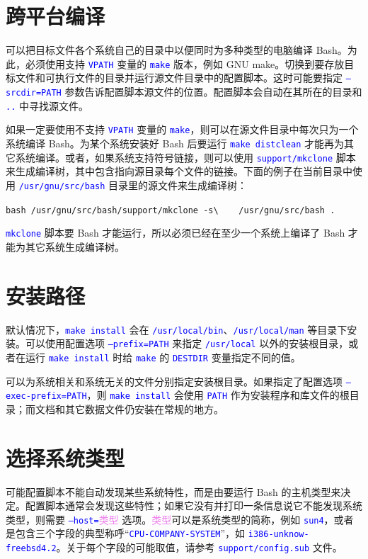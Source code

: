 \documentclass[openany,notitlepage]{book}
\newcommand{\codeblock}[1]{\begin{center}\begin{minipage}{.7\textwidth}{\tt #1}\end{minipage}\end{center}}
\newcommand{\codeSpecial}[1]{\textcolor[RGB]{255,20,147}{\texttt{#1}}}
\newcommand{\code}[1]{\textcolor{blue}{{\tt #1}}}
\newcommand{\hs}[1]{{\textcolor{violet}{#1}}}
\newcommand{\tab}{\mbox{\ \ \ \ }}
\begin{document}
\begin{CJK}{UTF8}{song}
\section{跨平台编译} %
可以把目标文件各个系统自己的目录中以便同时为多种类型的电脑编译 Bash。为此，必须使用支持 \code{VPATH} 变量的 \code{make} 版本，例如 GNU make。切换到要存放目标文件和可执行文件的目录并运行源文件目录中的配置脚本。这时可能要指定 \code{--srcdir=PATH} 参数告诉配置脚本源文件的位置。配置脚本会自动在其所在的目录和 \code{..} 中寻找源文件。

如果一定要使用不支持 \code{VPATH} 变量的 \code{make}，则可以在源文件目录中每次只为一个系统编译 Bash。为某个系统安装好 Bash 后要运行 \code{make distclean} 才能再为其它系统编译。或者，如果系统支持符号链接，则可以使用 \code{support/mkclone} 脚本来生成编译树，其中包含指向源目录每个文件的链接。下面的例子在当前目录中使用 \code{/usr/gnu/src/bash} 目录里的源文件来生成编译树：
    \codeblock{bash /usr/gnu/src/bash/support/mkclone \codeSpecial{-s}\textbackslash\newline\tab/usr/gnu/src/bash .}
\code{mkclone} 脚本要 Bash 才能运行，所以必须已经在至少一个系统上编译了 Bash 才能为其它系统生成编译树。

\section{安装路径} %
默认情况下，\code{make install} 会在 \code{/usr/local/bin}、\code{/usr/local/man} 等目录下安装。可以使用配置选项 \code{--prefix=PATH} 来指定 \code{/usr/local} 以外的安装根目录，或者在运行 \code{make install} 时给 \code{make} 的 \code{DESTDIR} 变量指定不同的值。

可以为系统相关和系统无关的文件分别指定安装根目录。如果指定了配置选项 \code{--exec-prefix=PATH}，则 \code{make install} 会使用 \code{PATH} 作为安装程序和库文件的根目录；而文档和其它数据文件仍安装在常规的地方。

\section{选择系统类型} %
可能配置脚本不能自动发现某些系统特性，而是由要运行 Bash 的主机类型来决定。配置脚本通常会发现这些特性；如果它没有并打印一条信息说它不能发现系统类型，则需要 \code{--host=}\hs{类型} 选项。\hs{类型}可以是系统类型的简称，例如 \code{sun4}，或者是包含三个字段的典型称呼``\code{CPU-COMPANY-SYSTEM}''，如 \code{i386-unknow-freebsd4.2}。关于每个字段的可能取值，请参考 \code{support/config.sub} 文件。


\end{CJK}
\end{document}
